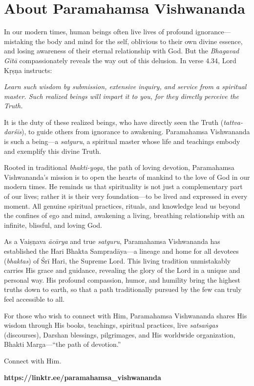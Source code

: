 \chapter{About Paramahamsa Vishwananda}\label{chap-about-paramahamsa-vishwananda}

\bigskip

In our modern times, human beings often live lives of profound ignorance---mistaking the body and mind for the self, oblivious to their own divine essence, and losing awareness of their eternal relationship with God. But the \textit{Bhagavad Gītā} compassionately reveals the way out of this delusion. In verse 4.34, Lord Kṛṣṇa instructs:

\begin{customquote}\fontsize{10}{11}\selectfont
\textit{Learn such wisdom by submission, extensive inquiry, and service from a spiritual master. Such realized beings will impart it to you, for they directly perceive the Truth.}
\end{customquote}

It is the duty of these realized beings, who have directly seen the Truth (\textit{tattva-darśīs}), to guide others from ignorance to awakening. Paramahamsa Vishwananda is such a being---a \textit{satguru}, a spiritual master whose life and teachings embody and exemplify this divine Truth.

Rooted in traditional \textit{bhakti-yoga}, the path of loving devotion, Paramahamsa Vishwananda’s mission is to open the hearts of mankind to the love of God in our modern times.  He reminds us that spirituality is not just a complementary part of our lives; rather it is their very foundation---to be lived and expressed in every moment. All genuine spiritual practices, rituals, and knowledge lead us beyond the confines of ego and mind, awakening a living, breathing relationship with an infinite, blissful, and loving God.

As a Vaiṣṇava \textit{ācārya} and true \textit{satguru}, Paramahamsa Vishwananda has established the Hari Bhakta Sampradāya---a lineage and home for all devotees (\textit{bhaktas}) of Śrī Hari, the Supreme Lord. This living tradition unmistakably carries His grace and guidance, revealing the glory of the Lord in a unique and personal way. His profound compassion, humor, and humility bring the highest truths down to earth, so that a path traditionally pursued by the few can truly feel accessible to all.

For those who wish to connect with Him, Paramahamsa Vishwananda shares His wisdom through His books, teachings, spiritual practices, live \textit{satsaṅgas} (discourses), Darshan blessings, pilgrimages, and His worldwide organization, Bhakti Marga---\enquote{the path of devotion.}

\bigskip

\noindent Connect with Him.

\noindent\textbf{https://linktr.ee/paramahamsa\_vishwananda}

\bigskip
\begin{center}
\end{center}
